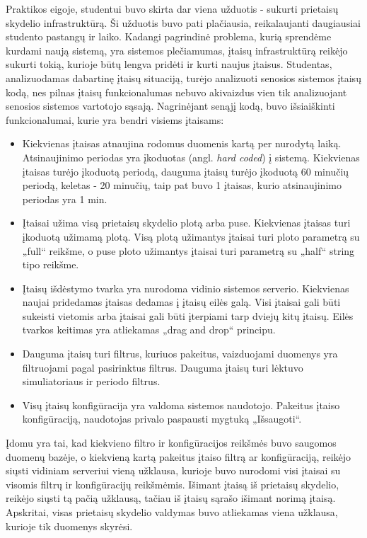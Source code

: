 \documentclass{VUMIFPSbakalaurinis}
\begin{document}
Praktikos eigoje, studentui buvo skirta dar viena užduotis - sukurti prietaisų skydelio infrastruktūrą. Ši užduotis buvo pati plačiausia, reikalaujanti daugiausiai studento pastangų ir laiko. Kadangi pagrindinė problema, kurią sprendėme kurdami naują sistemą, yra sistemos plečiamumas, įtaisų infrastruktūrą reikėjo sukurti tokią, kurioje būtų lengva pridėti ir kurti naujus įtaisus. Studentas, analizuodamas dabartinę įtaisų situaciją, turėjo analizuoti senosios sistemos įtaisų kodą, nes pilnas įtaisų funkcionalumas nebuvo akivaizdus vien tik analizuojant senosios sistemos vartotojo sąsają. Nagrinėjant senąjį kodą, buvo išsiaiškinti funkcionalumai, kurie yra bendri visiems įtaisams:
\begin{itemize}
    \item Kiekvienas įtaisas atnaujina rodomus duomenis kartą per nurodytą laiką. Atsinaujinimo periodas yra įkoduotas (angl. \textit{hard coded}) į sistemą. Kiekvienas įtaisas turėjo įkoduotą periodą, dauguma įtaisų turėjo įkoduotą 60 minučių periodą, keletas - 20 minučių, taip pat buvo 1 įtaisas, kurio atsinaujinimo periodas yra 1 min.
    \item Įtaisai užima visą prietaisų skydelio plotą arba puse. Kiekvienas įtaisas turi įkoduotą užimamą plotą. Visą plotą užimantys įtaisai turi ploto parametrą su „full“ reikšme, o puse ploto užimantys įtaisai turi parametrą su „half“ string tipo reikšme.
    \item Įtaisų išdėstymo tvarka yra nurodoma vidinio sistemos serverio. Kiekvienas naujai pridedamas įtaisas dedamas į įtaisų eilės galą. Visi įtaisai gali būti sukeisti vietomis arba įtaisai gali būti įterpiami tarp dviejų kitų įtaisų. Eilės tvarkos keitimas yra atliekamas „drag and drop“ principu.
    \item Dauguma įtaisų turi filtrus, kuriuos pakeitus, vaizduojami duomenys yra filtruojami pagal pasirinktus filtrus. Dauguma įtaisų turi lėktuvo simuliatoriaus ir periodo filtrus.
    \item Visų įtaisų konfigūracija yra valdoma sistemos naudotojo. Pakeitus įtaiso konfigūraciją, naudotojas privalo paspausti mygtuką „Išsaugoti“. 
\end{itemize}

Įdomu yra tai, kad kiekvieno filtro ir konfigūracijos reikšmės buvo saugomos duomenų bazėje, o kiekvieną kartą pakeitus įtaiso filtrą ar konfigūraciją, reikėjo siųsti vidiniam serveriui vieną užklausa, kurioje buvo nurodomi visi įtaisai su visomis filtrų ir konfigūracijų reikšmėmis. Išimant įtaisą iš prietaisų skydelio, reikėjo siųsti tą pačią užklausą, tačiau iš įtaisų sąrašo išimant norimą įtaisą. Apskritai, visas prietaisų skydelio valdymas buvo atliekamas viena užklausa, kurioje tik duomenys skyrėsi.
\end{document}
